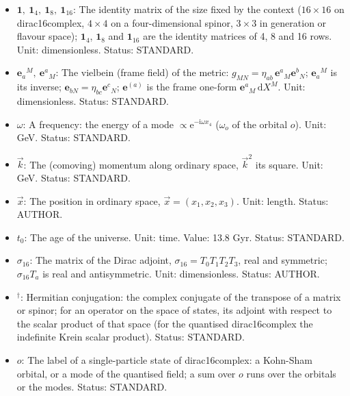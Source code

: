 \documentclass[
  10pt,
]{article}
\begin{document}
\begin{itemize}
  spinor field of eight dimensions;
  \(\bar\Psi = \Psi^\dagger\sigma_{16}\) is its Dirac adjoint; in a term
  of the fold, \(\Psi\) is its value at \(\sigma = 0\). Unit:
  GeV\(^{7/2}\). Status: AUTHOR.
\item
  \(\mathbf{1},\ \mathbf{1}_4,\ \mathbf{1}_8,\ \mathbf{1}_{16}\): The
  identity matrix of the size fixed by the context (\(16 \times 16\) on
  dirac16complex, \(4 \times 4\) on a four-dimensional spinor,
  \(3 \times 3\) in generation or flavour space); \(\mathbf{1}_4\),
  \(\mathbf{1}_8\) and \(\mathbf{1}_{16}\) are the identity matrices of
  4, 8 and 16 rows. Unit: dimensionless. Status: STANDARD.
\item
  \(\mathbf{e}_a{}^M,\ \mathbf{e}^a{}_M\): The vielbein (frame field) of
  the metric: \(g_{MN} = \eta_{ab}\,\mathbf{e}^a{}_M\mathbf{e}^b{}_N\);
  \(\mathbf{e}_a{}^M\) is its inverse;
  \(\mathbf{e}_{bN} = \eta_{bc}\mathbf{e}^c{}_N\); \(\mathbf{e}^{(a)}\)
  is the frame one-form \(\mathbf{e}^a{}_M\,\mathrm{d}X^M\). Unit:
  dimensionless. Status: STANDARD.
\item
  \(\omega\): A frequency: the energy of a mode
  \(\propto \mathrm{e}^{-\mathrm{i}\omega x_4}\) (\(\omega_o\) of the
  orbital \(o\)). Unit: GeV. Status: STANDARD.
\item
  \(\vec k\): The (comoving) momentum along ordinary space, \(\vec k^2\)
  its square. Unit: GeV. Status: STANDARD.
\item
  \(\vec x\): The position in ordinary space,
  \(\vec x = (x_1, x_2, x_3)\). Unit: length. Status: AUTHOR.
\item
  \(t_0\): The age of the universe. Unit: time. Value: 13.8 Gyr. Status:
  STANDARD.
\item
  \(\sigma_{16}\): The matrix of the Dirac adjoint,
  \(\sigma_{16} = T_0T_1T_2T_3\), real and symmetric; \(\sigma_{16}T_a\)
  is real and antisymmetric. Unit: dimensionless. Status: AUTHOR.
\item
  \({}^\dagger\): Hermitian conjugation: the complex conjugate of the
  transpose of a matrix or spinor; for an operator on the space of
  states, its adjoint with respect to the scalar product of that space
  (for the quantised dirac16complex the indefinite Krein scalar
  product). Status: STANDARD.
\item
  \(o\): The label of a single-particle state of dirac16complex: a
  Kohn-Sham orbital, or a mode of the quantised field; a sum over \(o\)
  runs over the orbitals or the modes. Status: STANDARD.
\end{itemize}
\end{document}

